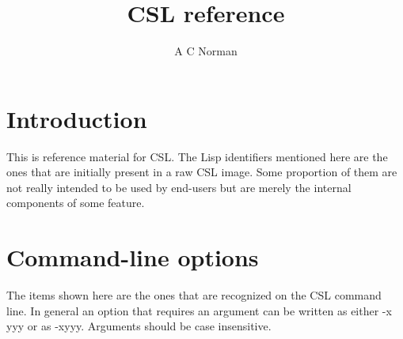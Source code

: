 \documentclass[a4paper,11pt]{article}
\title{CSL reference}
\author{A C Norman}
\begin{document}
\maketitle
\section{Introduction}
This is reference material for CSL. The Lisp identifiers mentioned here
are the ones that are initially present in a raw CSL image. Some
proportion of them are not really intended to be used by end-users but
are merely the internal components of some feature.

\section{Command-line options}
The items shown here are the ones that are recognized on the CSL command
line. In general an option that requires an argument can be written as either
{\ttfamily -x yyy} or as {\ttfamily -xyyy}. Arguments should be case
insensitive.
\end{document}
